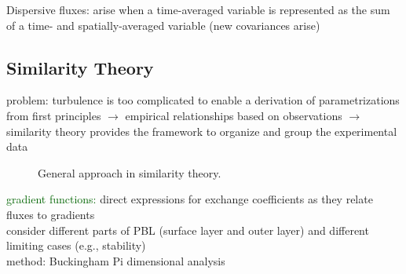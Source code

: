 \documentclass[11pt]{article}
\begin{document}
Dispersive fluxes: arise when a time-averaged variable is represented as the sum of a time- and spatially-averaged variable (new covariances arise)\\ 
 
 
	\subsection{Similarity Theory}
	problem: turbulence is too complicated to enable a derivation of parametrizations from first principles $\rightarrow$ empirical relationships based on observations $\rightarrow$ similarity theory provides the framework to organize and group the experimental data \\

			\begin{figure}[H]
		\small
		\centering
		\caption{General approach in similarity theory.}
	\end{figure}
		\textcolor{darkgreen}{gradient functions:} direct expressions for exchange coefficients as they relate fluxes to gradients \\
		consider different parts of PBL (surface layer and outer layer) and different limiting cases (e.g., stability) \\
		
	method: Buckingham Pi dimensional analysis \\
	
\end{document}
